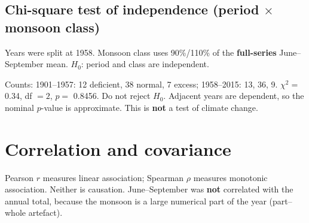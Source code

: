 \documentclass[
]{article}
\begin{document}
\subsection{\texorpdfstring{Chi-square test of independence (period
\(\times\) monsoon
class)}{Chi-square test of independence (period \textbackslash times monsoon class)}}\label{chi-square-test-of-independence-period-times-monsoon-class}

Years were split at 1958. Monsoon class uses 90\%/110\% of the
\textbf{full-series} June--September mean. \(H_0\): period and class are
independent.

Counts: 1901--1957: 12 deficient, 38 normal, 7 excess; 1958--2015: 13,
36, 9. \(\chi^2=\) 0.34, df \(=2\), \(p=\) 0.8456. Do not reject
\(H_0\). Adjacent years are dependent, so the nominal \(p\)-value is
approximate. This is \textbf{not} a test of climate change.

\section{Correlation and covariance}\label{correlation-and-covariance}

Pearson \(r\) measures linear association; Spearman \(\rho\) measures
monotonic association. Neither is causation. June--September was
\textbf{not} correlated with the annual total, because the monsoon is a
large numerical part of the year (part--whole artefact).
\end{document}
